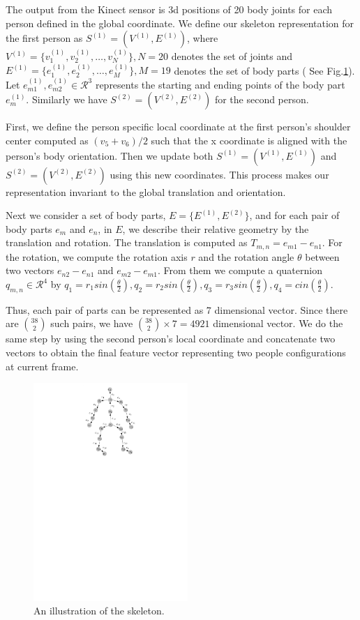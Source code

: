 \documentclass[10pt,twocolumn,letterpaper]{article}
\begin{document}
The output from the Kinect sensor is 3d positions of 20 body joints for each person defined in the global coordinate. We define our skeleton representation for the first person as $S^{(1)}=(V^{(1)},E^{(1)})$, where $V^{(1)}=\{v_{1}^{(1)},v_{2}^{(1)},\dots,v_{N}^{(1)}\}, N=20$ denotes the set of joints and $E^{(1)}=\{e_{1}^{(1)},e_{2}^{(1)},\dots,e_{M}^{(1)}\}, M=19$ denotes the set of body parts ( See Fig.\ref{fig:skeleton}). Let $e_{m1}^{(1)},e_{m2}^{(1)} \in \mathcal{R}^3$ represents the starting and ending points of the body part $e_{m}^{(1)}$. Similarly we have $S^{(2)}=(V^{(2)},E^{(2)})$ for the second person.

First, we define the person specific local coordinate at the first person's shoulder center computed as $(v_5 + v_6)/2$ such that the x coordinate is aligned with the person's body orientation. Then we update both $S^{(1)}=(V^{(1)},E^{(1)})$ and $S^{(2)}=(V^{(2)},E^{(2)})$ using this new coordinates. This process makes our representation invariant to the global translation and orientation. 

Next we consider a set of body parts, $E=\{E^{(1)},E^{(2)}\}$, and for each pair of body parts $e_m$ and $e_n$, in $E$, we describe their relative geometry by the translation and rotation. The translation is computed as $T_{m,n}=e_{m1}-e_{n1}$. For the rotation, we compute the rotation axis $r$ and the rotation angle $\theta$ between two vectors $e_{n2}-e_{n1}$ and $e_{m2}-e_{m1}$. From them we compute a quaternion $q_{m,n} \in \mathcal{R}^4$ by $q_1=r_1 sin( \frac{\theta}{2} ), q_2=r_2 sin( \frac{\theta}{2} ), q_3=r_3 sin( \frac{\theta}{2}), q_4=cin( \frac{\theta}{2})$.

Thus, each pair of parts can be represented as 7 dimensional vector. Since there are $\binom{38}{2}$ such pairs, we have $\binom{38}{2} \times 7 = 4921$ dimensional vector. We do the same step by using the second person's local coordinate and concatenate two vectors to obtain the final feature vector representing two people configurations at current frame.

\begin{figure}[htb]
\begin{center}
\includegraphics[width=2.3in]{skeleton.pdf}
\caption{An illustration of the skeleton. \label{fig:skeleton}}
\end{center}
\end{figure}
\end{document}
